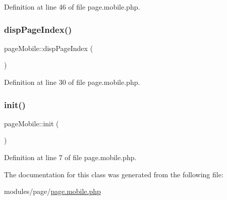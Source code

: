 Definition at line 46 of file page.\+mobile.\+php.

\mbox{\label{classpageMobile_abefd2674d7ecf5462aaeb0194aac495a}} 
\subsubsection{\texorpdfstring{disp\+Page\+Index()}{dispPageIndex()}}
{\footnotesize\ttfamily page\+Mobile\+::disp\+Page\+Index (\begin{DoxyParamCaption}{ }\end{DoxyParamCaption})}



Definition at line 30 of file page.\+mobile.\+php.

\mbox{\label{classpageMobile_a5dd50db2aed4a910e6dcd1178f55e9c1}} 
\subsubsection{\texorpdfstring{init()}{init()}}
{\footnotesize\ttfamily page\+Mobile\+::init (\begin{DoxyParamCaption}{ }\end{DoxyParamCaption})}



Definition at line 7 of file page.\+mobile.\+php.



The documentation for this class was generated from the following file\+:\begin{DoxyCompactItemize}
\item 
modules/page/\hyperlink{page_8mobile_8php}{page.\+mobile.\+php}\end{DoxyCompactItemize}
